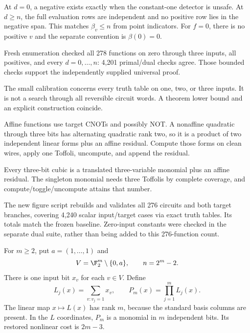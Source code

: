 At $d=0$, a negative exists exactly when the constant-one detector is unsafe.
At $d\ge n$, the full evaluation rows are independent and no positive row
lies in the negative span. This matches $\beta_v\le n$ from point indicators.
For $f=0$, there is no positive $v$ and the separate convention is $\beta(0)=0$.

Fresh enumeration checked all 278 functions on zero through three inputs,
all positives, and every $d=0,\ldots,n$: 4,201 primal/dual checks agree.
Those bounded checks support the independently supplied universal proof.


The small calibration concerns every truth table on one, two, or three
inputs. It is not a search through all reversible circuit words. A theorem
lower bound and an explicit construction coincide.


Affine functions use target CNOTs and possibly NOT. A nonaffine quadratic
through three bits has alternating quadratic rank two, so it is a product
of two independent linear forms plus an affine residual. Compute those
forms on clean wires, apply one Toffoli, uncompute, and append the residual.

Every three-bit cubic is a translated three-variable monomial plus an
affine residual. The singleton monomial needs three Toffolis by complete
coverage, and compute/toggle/uncompute attains that number.

The new figure script rebuilds and validates all 276 circuits and both target
branches, covering 4,240 scalar input/target cases via exact truth tables.
Its totals match the frozen baseline. Zero-input constants were checked in
the separate dual suite, rather than being added to this 276-function count.


For $m\ge2$, put $a=(1,\ldots,1)$ and
\[
 V=\F_2^m\setminus\{0,a\},\qquad n=2^m-2.
\]
There is one input bit $x_v$ for each $v\in V$. Define
\[
 L_j(x)=\sum_{v:v_j=1}x_v,\qquad
 P_m(x)=\prod_{j=1}^m L_j(x).
\]
The linear map $x\mapsto L(x)$ has rank $m$, because the standard basis
columns are present. In the $L$ coordinates, $P_m$ is a monomial in $m$
independent bits. Its restored nonlinear cost is $2m-3$.

